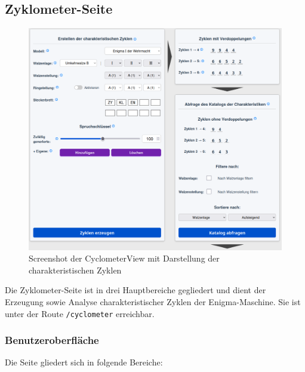 \documentclass[12pt, ngerman, a4paper, numbers=noenddot]{article}
\begin{document}
\subsection{Zyklometer-Seite}
\begin{figure}[H]
	\centering
	\includegraphics[width=1\textwidth]{bilder/CyclometerView_Cyclometer.png}
	\caption{Screenshot der CyclometerView mit Darstellung der charakteristischen Zyklen}
	\label{fig:CyclometerView_Cyclometer}
\end{figure}


Die Zyklometer-Seite ist in drei Hauptbereiche gegliedert und dient der Erzeugung sowie Analyse charakteristischer Zyklen der Enigma-Maschine. Sie ist unter der Route \lstinline|/cyclometer| erreichbar.


\subsubsection{Benutzeroberfläche}

Die Seite gliedert sich in folgende Bereiche:
\end{document}

